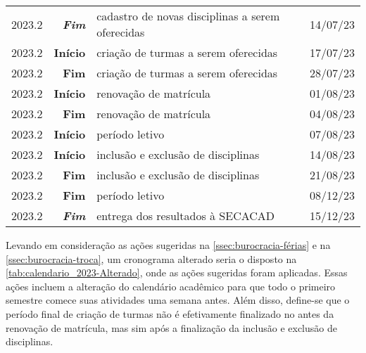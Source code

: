 \begin{table}[H]
\begin{tabular}{| c r l c |}
    2023.2            & \textbf{\textit{Fim}} & cadastro de novas disciplinas a serem oferecidas & 14/07/23      \\
    2023.2            & \textbf{Início}       & criação de turmas a serem oferecidas             & 17/07/23      \\
    2023.2            & \textbf{Fim}          & criação de turmas a serem oferecidas             & 28/07/23      \\
    2023.2            & \textbf{Início}       & renovação de matrícula                           & 01/08/23      \\
    2023.2            & \textbf{Fim}          & renovação de matrícula                           & 04/08/23      \\
    2023.2            & \textbf{Início}       & período letivo                                   & 07/08/23      \\
    2023.2            & \textbf{Início}       & inclusão e exclusão de disciplinas               & 14/08/23      \\
    2023.2            & \textbf{Fim}          & inclusão e exclusão de disciplinas               & 21/08/23      \\
    2023.2            & \textbf{Fim}          & período letivo                                   & 08/12/23      \\
    2023.2            & \textbf{\textit{Fim}} & entrega dos resultados à SECACAD                 & 15/12/23      \\

    \hline
  \end{tabular}
\end{table}

Levando em consideração as ações sugeridas na \autoref{ssec:burocracia-férias} e na \autoref{ssec:burocracia-troca}, um cronograma alterado seria o disposto na \autoref{tab:calendario_2023-Alterado}, onde as ações sugeridas foram aplicadas. Essas ações incluem a alteração do calendário acadêmico para que todo o primeiro semestre comece suas atividades uma semana antes. Além disso, define-se que o período final de criação de turmas não é efetivamente finalizado no antes da renovação de matrícula, mas sim após a finalização da inclusão e exclusão de disciplinas.

